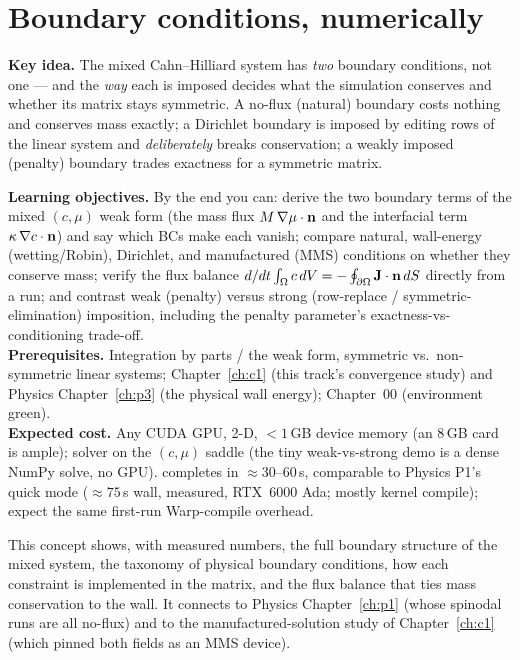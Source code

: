 \chapter{Boundary conditions, numerically}
\label{ch:c2}
\begin{keybox}
\textbf{Key idea.} The mixed Cahn--Hilliard system has \emph{two}
boundary conditions, not one --- and the \emph{way} each is imposed
decides what the simulation conserves and whether its matrix stays
symmetric. A no-flux (natural) boundary costs nothing and conserves mass
exactly; a Dirichlet boundary is imposed by editing rows of the linear
system and \emph{deliberately} breaks conservation; a weakly imposed
(penalty) boundary trades exactness for a symmetric matrix.
\end{keybox}

\begin{keybox}
\textbf{Learning objectives.} By the end you can: derive the two
boundary terms of the mixed $(c,\mu)$ weak form (the mass flux
$M\,\nabla\mu\cdot\mathbf n$ and the interfacial term
$\kappa\,\nabla c\cdot\mathbf n$) and say which BCs make each vanish;
compare natural, wall-energy (wetting/Robin), Dirichlet, and
manufactured (MMS) conditions on whether they conserve mass; verify the
flux balance $d/dt\int_\Omega c\,dV=-\oint_{\partial\Omega}\mathbf J\cdot
\mathbf n\,dS$ directly from a run; and contrast weak (penalty) versus
strong (row-replace / symmetric-elimination) imposition, including the
penalty parameter's exactness-vs-conditioning trade-off.\\[2pt]
\textbf{Prerequisites.} Integration by parts / the weak form, symmetric
vs.\ non-symmetric linear systems; Chapter~\ref{ch:c1} (this track's
convergence study) and Physics Chapter~\ref{ch:p3} (the physical wall
energy); Chapter~00 (environment green).\\[2pt]
\textbf{Expected cost.} Any CUDA GPU, 2-D, $<1$\,GB device memory (an
8\,GB card is ample); solver  on the $(c,\mu)$ saddle (the
tiny weak-vs-strong demo is a dense NumPy solve, no GPU). 
completes in $\approx$30--60\,s, comparable to Physics P1's quick mode
($\approx75$\,s wall, measured, RTX~6000 Ada; mostly kernel compile);
expect the same first-run Warp-compile overhead.
\end{keybox}

This concept shows, with measured numbers, the full boundary structure of
the mixed system, the taxonomy of physical boundary conditions, how each
constraint is implemented in the matrix, and the flux balance that ties
mass conservation to the wall. It connects to Physics
Chapter~\ref{ch:p1} (whose spinodal runs are all no-flux) and to the
manufactured-solution study of Chapter~\ref{ch:c1} (which pinned both
fields as an MMS device).

